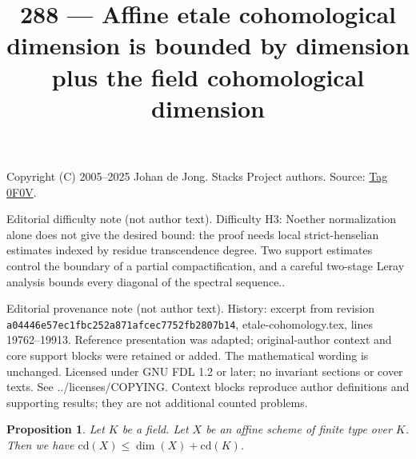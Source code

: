 \documentclass{amsart}
\theoremstyle{plain}
\newtheorem{proposition}[subsection]{Proposition}
\theoremstyle{definition}
\theoremstyle{remark}
\numberwithin{equation}{subsection}
\begin{document}
\title[Stacks Project, Tag 0F0V]{288 --- Affine etale cohomological dimension is bounded by dimension plus the field cohomological dimension}
\maketitle
\noindent Copyright (C) 2005--2025 Johan de Jong. Stacks Project authors. Source: \href{https://stacks.math.columbia.edu/tag/0F0V}{Tag 0F0V}.

\noindent Editorial difficulty note (not author text). Difficulty H3: Noether normalization alone does not give the desired bound: the proof needs local strict-henselian estimates indexed by residue transcendence degree. Two support estimates control the boundary of a partial compactification, and a careful two-stage Leray analysis bounds every diagonal of the spectral sequence..

\noindent Editorial provenance note (not author text). History: excerpt from revision \texttt{a0444\allowbreak 6e57e\allowbreak c1fbc\allowbreak 252a8\allowbreak 71afc\allowbreak ec775\allowbreak 2fb28\allowbreak 07b14}, etale-cohomology.tex, lines 19762--19913. Reference presentation was adapted; original-author context and core support blocks were retained or added. The mathematical wording is unchanged. Licensed under GNU FDL 1.2 or later; no invariant sections or cover texts. See ../licenses/COPYING. Context blocks reproduce author definitions and supporting results; they are not additional counted problems.

\begin{proposition}
\label{proposition-cd-affine}
Let $K$ be a field. Let $X$ be an affine scheme of finite type over $K$.
Then we have $\text{cd}(X) \leq \dim(X) + \text{cd}(K)$.
\end{proposition}
\end{document}
